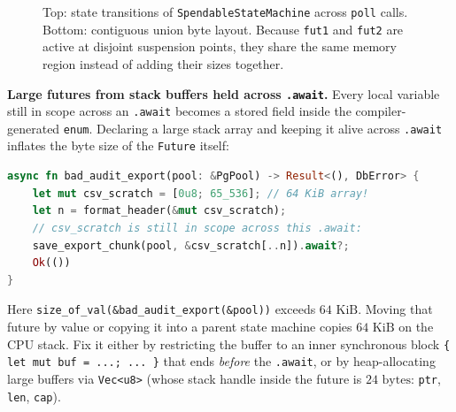 \begin{figure}[H]
\caption{Top: state transitions of \texttt{SpendableStateMachine} across \texttt{poll} calls. Bottom: contiguous union byte layout. Because \texttt{fut1} and \texttt{fut2} are active at disjoint suspension points, they share the same memory region instead of adding their sizes together.}
\label{ch12:fig-state-machine-layout}
\end{figure}

\begin{trapbox}
\textbf{Large futures from stack buffers held across \texttt{.await}.} Every local variable still in scope across an \texttt{.await} becomes a stored field inside the compiler-generated \texttt{enum}. Declaring a large stack array and keeping it alive across \texttt{.await} inflates the byte size of the \texttt{Future} itself:
\begin{lstlisting}[language=Rust]
async fn bad_audit_export(pool: &PgPool) -> Result<(), DbError> {
    let mut csv_scratch = [0u8; 65_536]; // 64 KiB array!
    let n = format_header(&mut csv_scratch);
    // csv_scratch is still in scope across this .await:
    save_export_chunk(pool, &csv_scratch[..n]).await?;
    Ok(())
}
\end{lstlisting}
Here \texttt{size\_of\_val(\&bad\_audit\_export(\&pool))} exceeds $64\text{ KiB}$. Moving that future by value or copying it into a parent state machine copies $64\text{ KiB}$ on the CPU stack. Fix it either by restricting the buffer to an inner synchronous block \texttt{\{ let mut buf = ...; ... \}} that ends \emph{before} the \texttt{.await}, or by heap-allocating large buffers via \texttt{Vec<u8>} (whose stack handle inside the future is $24\text{ bytes}$: \texttt{ptr}, \texttt{len}, \texttt{cap}).
\end{trapbox}

